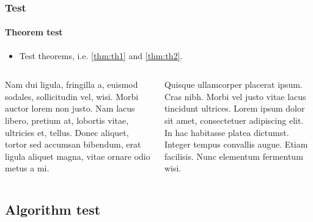 \documentclass[aspectratio=169,hyperref={implicit=true}]{beamer}
\begin{document}
\begin{frame}

\frametitle{Test}
\framesubtitle{Theorem test}

\begin{itemize}
  \item Test theorems, i.e. \cref{thm:th1} and \cref{thm:th2}.
\end{itemize}

\begin{columns}
  \begin{column}{.48\textwidth}
    \begin{theorem} \label{thm:th1}
      Nam dui ligula, fringilla a, euismod
      sodales, sollicitudin vel, wisi. Morbi
      auctor lorem non justo. Nam lacus
      libero, pretium at, lobortis vitae,
      ultricies et, tellus. Donec aliquet,
      tortor sed accumsan bibendum, erat
      ligula aliquet magna, vitae ornare
      odio metus a mi.
    \end{theorem}
  \end{column}
  \begin{column}{.48\textwidth}
    \begin{theorem} \label{thm:th2}
      Quisque ullamcorper placerat ipsum.
      Cras nibh. Morbi vel justo vitae lacus
      tincidunt ultrices. Lorem ipsum dolor
      sit amet, consectetuer adipiscing elit.
      In hac habitasse platea dictumst.
      Integer tempus convallis augue.
      Etiam facilisis. Nunc elementum
      fermentum wisi.
    \end{theorem}
  \end{column}
\end{columns}

\end{frame}

\subsection{Algorithm test}
\end{document}
